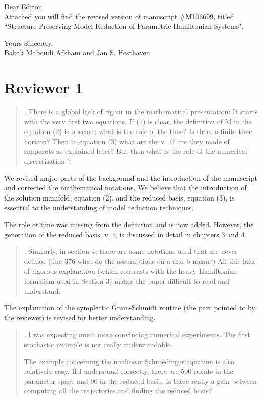 \documentclass[a4paper]{article}
\newcommand{\breview}{\begin{quotation}\begin{bf}\noindent}
\newcommand{\ereview}{\end{bf}\end{quotation}}
\begin{document}
Dear Editor, \\[1cm]

Attached you will find the revised version of manuscript \#M106699, titled ``Structure Preserving Model Reduction of Parametric Hamiltonian Systems".

Yours Sincerely,\\[1.0cm]
Babak Maboudi Afkham and
Jan S. Hesthaven
\\[1cm]

\section*{Reviewer 1}

\breview
1. There is a global lack of rigour in the mathematical presentation: It starts with the very first two equations. If (1) is clear, the definition of M in the equation (2) is obscure: what is the role of the time? Is there a finite time horizon? Then in equation (3) what are the v\_i? are they made of snapshots as explained later? But then what is the role of the numerical discretisation ?
\ereview

We revised major parts of the background and the introduction of the manuscript and corrected the mathematical notations. We believe that the introduction of the solution manifold, equation (2), and the reduced basis, equation (3), is essential to the understanding of model reduction techniques. 

The role of time was missing from the definition and is now added. However, the generation of the reduced basis, v\_i, is discussed in detail in chapters 3 and 4.

\breview
2. Similarly, in section 4, there are some notations used that are never defined (line 376 what do the assumptions on a and b mean?) All this lack of rigorous explanation (which contrasts with the heavy Hamiltonian formalism used in Section 3) makes the paper difficult to read and understand. 
\ereview

The explanation of the symplectic Gram-Schmidt routine (the part pointed to by the reviewer) is revised for better understanding.

\breview
3. I was expecting much more convincing numerical experiments. The first stochastic example is not really understandable.

The example concerning the nonlinear Schroedinger equation is also relatively easy. If I understand correctly, there are 500 points in the parameter space and 90 in the reduced basis. Is there really a gain between computing all the trajectories and finding the reduced basis?
\ereview
\end{document}
